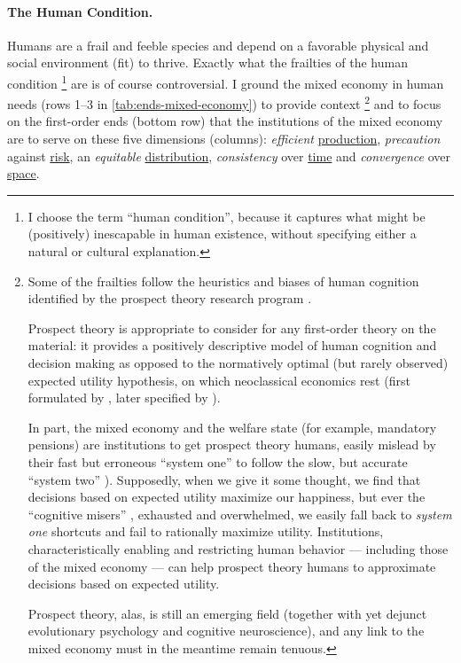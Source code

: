 \paragraph{The Human Condition.} %
Humans are a frail and feeble species and depend on a favorable physical and social environment (fit) to thrive. 
Exactly what the frailties of the human condition
\footnote{\label{fn:human-condition}
	I choose the term ``human condition'', because it captures what might be (positively) inescapable in human existence, without specifying either a natural or cultural explanation.
}
are is of course controversial. 
I ground the mixed economy in human needs (rows 1--3 in \autoref{tab:ends-mixed-economy}) to provide context
\footnote{
	Some of the frailties follow the heuristics and biases of human cognition identified by the prospect theory research program \citep{KahnemanTversky1979,Kahneman2011
}. 
	
	Prospect theory is appropriate to consider for any first-order theory on the material: it provides a positively descriptive model of human cognition and decision making as opposed to the normatively optimal (but rarely observed) expected utility hypothesis, on which neoclassical economics rest (first formulated by \citealt{Bernoulli1738}, later specified by \citealt{VonNeumannMorgenstern1944}). 
	
	In part, the mixed economy and the welfare state (for example, mandatory pensions) are institutions to get prospect theory humans, easily mislead by their fast but erroneous ``system one'' to follow the slow, but accurate ``system two'' \citep{Kahneman2011}). 
	Supposedly, when we give it some thought, we find that decisions based on expected utility \citep{Bernoulli1738} maximize our happiness, but ever the ``cognitive misers'' \citep{FiskeTaylor-1991-aa}, exhausted and overwhelmed, we easily fall back to \emph{system one} shortcuts and fail to rationally maximize utility. 
	Institutions, characteristically enabling and restricting human behavior --- including those of the mixed economy --- can help prospect theory humans to approximate decisions based on expected utility.	
	
	Prospect theory, alas, is still an emerging field (together with yet dejunct evolutionary psychology and cognitive neuroscience), and any link to the mixed economy must in the meantime remain tenuous.
} 
and to focus on the first-order ends (bottom row) that the institutions of the mixed economy are to serve on these five dimensions (columns): \emph{efficient} \hyperref[sec:production]{production}, \emph{precaution} against \hyperref[sec:risk]{risk}, an \emph{equitable} \hyperref[sec:distribution]{distribution}, \emph{consistency} over \hyperref[sec:time]{time} and \emph{convergence} over \hyperref[sec:space]{space}. %

